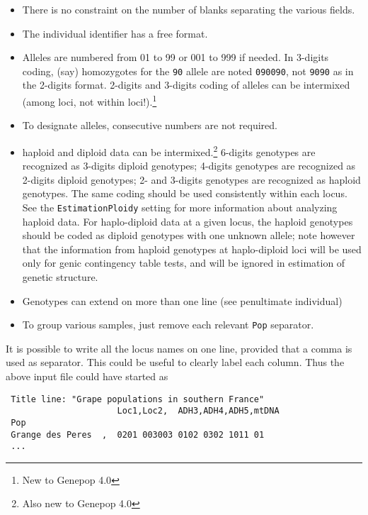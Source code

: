 \documentclass[12pt,]{book}
\let\rmarkdownfootnote\footnote%
\def\footnote{\protect\rmarkdownfootnote}
\theoremstyle{definition}
\theoremstyle{definition}
\theoremstyle{definition}
\theoremstyle{remark}
\begin{document}
\begin{itemize}
\item
  There is no constraint on the number of blanks separating the various
  fields.
\item
  The individual identifier has a free format.
\item
  Alleles are numbered from 01 to 99 or 001 to 999 if needed.
   In 3-digits coding,
   (say) homozygotes for the \texttt{90}
  allele are noted \texttt{090090}, not \texttt{9090} as in the 2-digits
  format. 2-digits and 3-digits coding of alleles can be intermixed
  (among loci, not within loci!).\footnote{New to Genepop 4.0}
\item
  To designate alleles, consecutive numbers are not required.
\item
  haploid and diploid data can be
  intermixed.\footnote{Also new to Genepop 4.0} 6-digits genotypes are
  recognized as 3-digits diploid
  genotypes; 4-digits genotypes are
  recognized as 2-digits diploid
  genotypes; 2- and 3-digits genotypes are
  recognized as haploid genotypes. The same coding
  should be used consistently within each locus. See the
  \texttt{EstimationPloidy} setting for more information about analyzing
  haploid data. For haplo-diploid data at
  a given locus, the haploid genotypes should be coded as diploid
  genotypes with one unknown allele; note however that the information
  from haploid genotypes at haplo-diploid loci will be used only for
  genic contingency table tests, and will be ignored in estimation of
  genetic structure.
\item
  Genotypes can extend on more than one line (see penultimate
  individual)
\item
  To group various samples, just remove each relevant \texttt{Pop}
  separator.
\end{itemize}

It is possible to write all the locus names on one line, provided that a
comma is used as separator. This could be useful to clearly label each
column. Thus the above input file could have started as

\begin{verbatim}
 Title line: "Grape populations in southern France"
                      Loc1,Loc2,  ADH3,ADH4,ADH5,mtDNA
 Pop
 Grange des Peres  ,  0201 003003 0102 0302 1011 01
 ...
\end{verbatim}
\end{document}
